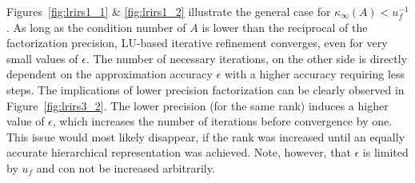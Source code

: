 Figures~\hyperref[fig:lrirs1_1]{\ref{fig:lrirs1_1}} \& \hyperref[fig:lrirs1_2]{\ref{fig:lrirs1_2}} illustrate the general case for $\kappa_\infty(A)<u_f^{-1}$. As long as the condition number of $A$ is lower than the reciprocal of the factorization precision, LU-based iterative refinement converges, even for very small values of $\epsilon$. The number of necessary iterations, on the other side is directly dependent on the approximation accuracy $\epsilon$ with a higher accuracy requiring less steps. The implications of lower precision factorization can be clearly observed in Figure~\hyperref[fig:lrirs3_2]{\ref{fig:lrirs3_2}}. The lower precision (for the same rank) induces a higher value of $\epsilon$, which increases the number of iterations before convergence by one. This issue would most likely disappear, if the rank was increased until an equally accurate hierarchical representation was achieved. Note, however, that $\epsilon$ is limited by $u_f$ and con not be increased arbitrarily.

